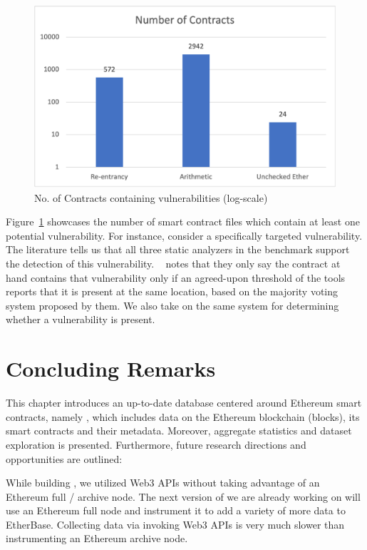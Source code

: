     \begin{figure}[t]
        \centering
        \includegraphics[width=1\textwidth]{figures/Picture1.png}
        \caption{No. of Contracts containing vulnerabilities (log-scale)}
        \label{fig:chart_vuln_count}
    \end{figure}
        
        Figure~\ref{fig:chart_vuln_count} showcases the number of smart contract files which contain at least one potential vulnerability.
        For instance, consider a specifically targeted vulnerability.
        The literature tells us that all three static analyzers in the benchmark support the detection of this vulnerability.
        ~\cite{yashavant2022scrawld} notes that they only say the contract at hand contains that vulnerability only if an agreed-upon threshold of the tools reports that it is present at the same location, based on the majority voting system proposed by them. We also take on the same system for determining whether a vulnerability is present.


\section{Concluding Remarks}
    This chapter introduces an up-to-date database centered around Ethereum smart contracts, namely \etherbase, which includes data on the Ethereum blockchain (blocks),
    its smart contracts and their metadata.
    Moreover, aggregate statistics and dataset exploration is presented.
    Furthermore, future research directions and opportunities are outlined:

    While building \etherbase, we utilized Web3 APIs without taking advantage of an Ethereum full / archive node.
    The next version of \etherbase we are already working on will use an Ethereum full node and instrument it to add a variety of more data to EtherBase.
    Collecting data via invoking Web3 APIs is very much slower than instrumenting an Ethereum archive node.
    
